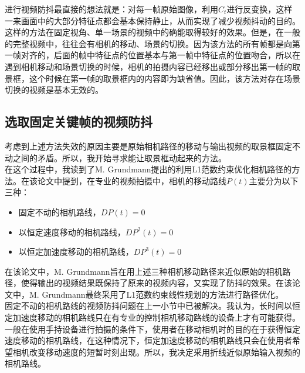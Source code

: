 \documentclass[journal, a4paper]{IEEEtran}
\begin{document}
    进行视频防抖最直接的想法就是：对每一帧原始图像，利用$C_{t}$进行反变换，这样一来画面中的大部分特征点都会基本保持静止，从而实现了减少视频抖动的目的。这样的方法在固定视角、单一场景的视频中的确能取得较好的效果。但是，在一般的完整视频中，往往会有相机的移动、场景的切换。因为该方法的所有帧都是向第一帧对齐的，后面的帧中特征点的位置基本与第一帧中特征点的位置吻合，所以在遇到相机移动和场景切换的时候，相机的拍摄内容已经移出或部分移出第一帧的取景框，这个时候在第一帧的取景框内的内容即为缺省值。因此，该方法对存在场景切换的视频是基本无效的。
    
\subsection{选取固定关键帧的视频防抖}
    考虑到上述方法失效的原因主要是原始相机路径的移动与输出视频的取景框固定不动之间的矛盾。所以，我开始寻求能让取景框动起来的方法。 \\
    
    在这个过程中，我读到了M. Grundmann提出的利用L1范数约束优化相机路径的方法\cite{L1Opt}。在该论文中提到，在专业的视频拍摄中，相机的移动路线$P(t)$主要分为以下三种：
    \begin{itemize}
    \item 固定不动的相机路线，$DP(t)=0$
    \item 以恒定速度移动的相机路线，$DP^2(t)=0$
    \item 以恒定加速度移动的相机路线，$DP^3(t)=0$
    \end{itemize}
    在该论文中，M. Grundmann旨在用上述三种相机移动路径来近似原始的相机路径，使得输出的视频结果既保持了原来的视频内容，又实现了防抖的效果。在该论文中，M. Grundmann最终采用了L1范数约束线性规划的方法进行路径优化。\\
    
    固定不动的相机路线的视频防抖问题在上一小节中已被解决。我认为，长时间以恒定加速度移动的相机路线只在有专业的控制相机移动路线的设备上才有可能获得。一般在使用手持设备进行拍摄的条件下，使用者在移动相机时的目的在于获得恒定速度移动的相机路线，在这种情况下，恒定加速度移动的相机路线只会在使用者希望相机改变移动速度的短暂时刻出现。所以，我决定采用折线近似原始输入视频的相机路线。\\
    
\end{document}
